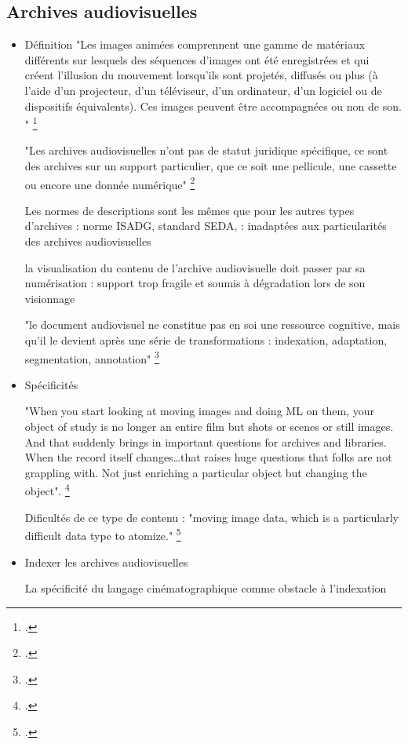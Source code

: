 \subsection{Archives audiovisuelles}

\begin{itemize}

\item Définition 
"Les images animées comprennent une gamme de matériaux différents sur lesquels des séquences d'images ont été enregistrées et qui créent l'illusion du mouvement lorsqu'ils sont projetés, diffusés ou plus (à l'aide d'un projecteur, d'un téléviseur, d'un ordinateur, d’un logiciel ou de dispositifs équivalents). Ces images peuvent être accompagnées ou non de son. " \footcite{zotero-item-646}

"Les archives audiovisuelles n’ont pas de statut juridique spécifique, ce sont des archives sur un support particulier, que ce soit une pellicule, une cassette ou encore une donnée numérique" \footcite{gill2024}

Les normes de descriptions sont les mêmes que pour les autres types d'archives : norme ISADG, standard SEDA, : inadaptées aux particularités des archives audiovisuelles 

la visualisation du contenu de l'archive audiovisuelle doit passer par sa numérisation : support trop fragile et soumis à dégradation lors de son visionnage 

"le document audiovisuel ne constitue pas en soi une
ressource cognitive, mais qu’il le devient après une série de transformations : indexation, adaptation, segmentation, annotation" \footcite{stockinger2011}

\item Spécificités  

"When you start looking at moving images and doing ML on them, your object of study is no longer an entire film but shots or scenes or still images. And that suddenly brings in important questions for archives and libraries. When the record itself changes…that raises huge questions that folks are not grappling with. Not just enriching a particular object but changing the object". \footcite{cordell}

Dificultés de ce type de contenu : 
"moving image data, which is a particularly difficult data type to atomize."
\footcite{cordell}

\item Indexer les archives audiovisuelles 

La spécificité du langage cinématographique comme obstacle à l'indexation 


\end{itemize}
